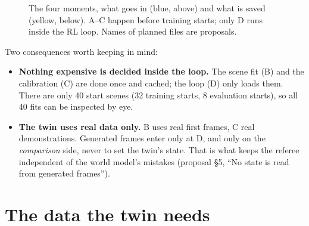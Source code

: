 \begin{figure}[h]
\centering

\caption{The four moments, what goes in (blue, above) and what is saved (yellow, below). A--C happen before training starts; only D runs inside the RL loop. Names of planned files are proposals.}
\label{twin:fig:lifecycle}
\end{figure}

Two consequences worth keeping in mind:
\begin{itemize}
\item \textbf{Nothing expensive is decided inside the loop.} The scene fit (B) and the calibration (C) are done once and cached; the loop (D) only loads them. There are only 40 start scenes (32 training starts, 8 evaluation starts), so all 40 fits can be inspected by eye.
\item \textbf{The twin uses real data only.} B uses real first frames, C real demonstrations. Generated frames enter only at D, and only on the \emph{comparison} side, never to set the twin's state. That is what keeps the referee independent of the world model's mistakes (proposal \S5, ``No state is read from generated frames'').
\end{itemize}

\section{The data the twin needs}\label{twin:sec:data}
